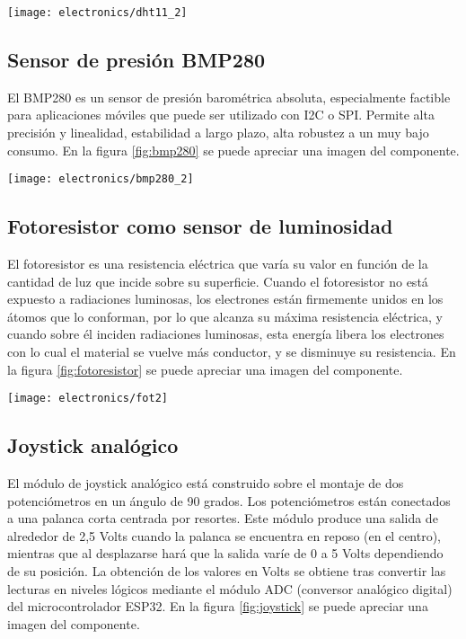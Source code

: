 \begin{center}
    \texttt{[image: electronics/dht11\_2]}
    \label{fig:dht11}
\end{center}

\subsection{Sensor de presión BMP280}

El BMP280 \cite{BMP280_datasheet} es un sensor de presión barométrica absoluta, especialmente factible para aplicaciones móviles que puede ser utilizado con I2C o SPI. Permite alta precisión y linealidad, estabilidad a largo plazo, alta robustez a un muy bajo consumo. En la figura \ref{fig:bmp280} se puede apreciar una imagen del componente.

\begin{center}
    \texttt{[image: electronics/bmp280\_2]}
    \label{fig:bmp280}
\end{center}

\subsection{Fotoresistor como sensor de luminosidad}

El fotoresistor es una resistencia eléctrica que varía su valor en función de la cantidad de luz que incide sobre su superficie. 
Cuando el fotoresistor no está expuesto a radiaciones luminosas, los electrones están firmemente unidos en los átomos que lo conforman, por lo que alcanza su máxima resistencia eléctrica, y cuando sobre él inciden radiaciones luminosas, esta energía libera los electrones con lo cual el material se vuelve más conductor, y se disminuye su resistencia. En la figura \ref{fig:fotoresistor} se puede apreciar una imagen del componente.

\begin{center}
    \texttt{[image: electronics/fot2]}
    \label{fig:fotoresistor}
\end{center}


\subsection{Joystick analógico}
 
El módulo de joystick analógico \cite{analog_joystick_datasheet} está construido sobre el montaje de dos potenciómetros en un ángulo de 90 grados. Los potenciómetros están conectados a una palanca corta centrada por resortes. 
Este módulo produce una salida de alrededor de 2,5 Volts cuando la palanca se encuentra en reposo (en el centro), mientras que al desplazarse hará que la salida varíe de 0 a 5 Volts dependiendo de su posición. La obtención de los valores en Volts se obtiene tras convertir las lecturas en niveles lógicos mediante el módulo ADC (conversor analógico digital) \cite{ESP32_adc} del microcontrolador ESP32. En la figura \ref{fig:joystick} se puede apreciar una imagen del componente.

